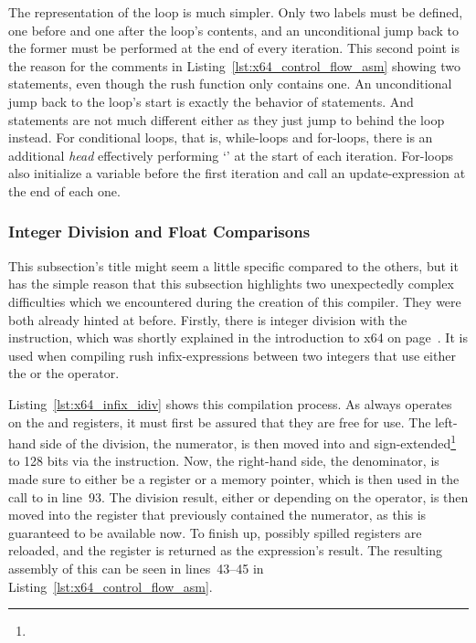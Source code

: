 
The representation of the loop is much simpler.
Only two labels must be defined, one before and one after the loop's contents, and an unconditional jump back to the former must be performed at the end of every iteration.
This second point is the reason for the comments in Listing~\ref{lst:x64_control_flow_asm} showing two  statements, even though the rush function only contains one.
An unconditional jump back to the loop's start is exactly the behavior of  statements.
And  statements are not much different either as they just jump to behind the loop instead.
For conditional loops, that is, while-loops and for-loops, there is an additional \emph{head} effectively performing `' at the start of each iteration.
For-loops also initialize a variable before the first iteration and call an update-expression at the end of each one.

\subsubsection{Integer Division and Float Comparisons}

This subsection's title might seem a little specific compared to the others, but it has the simple reason that this subsection highlights two unexpectedly complex difficulties which we encountered during the creation of this compiler.
They were both already hinted at before.
Firstly, there is integer division with the  instruction, which was shortly explained in the introduction to x64 on page~\pageref{x64_idiv}.
It is used when compiling rush infix-expressions between two integers that use either the \qVerb{/} or the \qVerbCmd{\%} operator.


Listing~\ref{lst:x64_infix_idiv} shows this compilation process.
As  always operates on the  and  registers, it must first be assured that they are free for use.
The left-hand side of the division, the numerator, is then moved into  and sign-extended\footnote{} to 128 bits via the  instruction.
Now, the right-hand side, the denominator, is made sure to either be a register or a memory pointer, which is then used in the call to  in line~93.
The division result, either  or  depending on the operator, is then moved into the register that previously contained the numerator, as this is guaranteed to be available now.
To finish up, possibly spilled registers are reloaded, and the register is returned as the expression's result.
The resulting assembly of this can be seen in lines~43--45 in Listing~\ref{lst:x64_control_flow_asm}.

